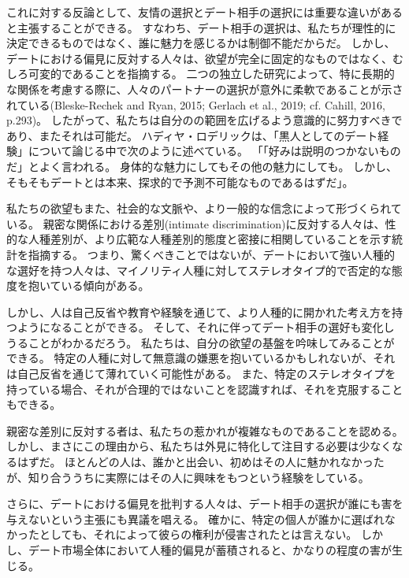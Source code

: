 \documentclass[paper=a4,book,openany]{jlreq}
\begin{document}
これに対する反論として、友情の選択とデート相手の選択には重要な違いがあると主張することができる。
すなわち、デート相手の選択は、私たちが理性的に決定できるものではなく、誰に魅力を感じるかは制御不能だからだ。
しかし、デートにおける偏見に反対する人々は、欲望が完全に固定的なものではなく、むしろ可変的であることを指摘する。
二つの独立した研究によって、特に長期的な関係を考慮する際に、人々のパートナーの選択が意外に柔軟であることが示されている(Bleske-Rechek and Ryan, 2015; Gerlach et al., 2019; cf. Cahill, 2016, p.293)。
\nocite{bleske-rechek15:_contin_chang_emerg,gerlach19:_predic_valid_adjus}
\nocite{cahill16:_sexual_desir_inequal_possib_trans}
したがって、私たちは自分のの範囲を広げるよう意識的に努力すべきであり、またそれは可能だ。
ハディヤ・ロデリックは、「黒人としてのデート経験」について論じる中で次のように述べている。
「「好みは説明のつかないものだ」とよく言われる。
身体的な魅力にしてもその他の魅力にしても。
しかし、そもそもデートとは本来、探求的で予測不可能なものであるはずだ」\citep{roderique17:_datin_black}。

私たちの欲望もまた、社会的な文脈や、より一般的な信念によって形づくられている。
親密な関係における差別(intimate discrimination)に反対する人々は、性的な人種差別が、より広範な人種差別的態度と密接に相関していることを示す統計を指摘する。
つまり、驚くべきことではないが、デートにおいて強い人種的な選好を持つ人々は、マイノリティ人種に対してステレオタイプ的で否定的な態度を抱いている傾向がある\citep{callander15:_is_sexual_racis_reall_racis}。

しかし、人は自己反省や教育や経験を通じて、より人種的に開かれた考え方を持つようになることができる。
そして、それに伴ってデート相手の選好も変化しうることがわかるだろう。
私たちは、自分の欲望の基盤を吟味してみることができる。
特定の人種に対して無意識の嫌悪を抱いているかもしれないが、それは自己反省を通じて薄れていく可能性がある。
また、特定のステレオタイプを持っている場合、それが合理的ではないことを認識すれば、それを克服することもできる。

親密な差別に反対する者は、私たちの惹かれが複雑なものであることを認める。
しかし、まさにこの理由から、私たちは外見に特化して注目する必要は少なくなるはずだ。
ほとんどの人は、誰かと出会い、初めはその人に魅かれなかったが、知り合ううちに実際にはその人に興味をもつという経験をしている。

さらに、デートにおける偏見を批判する人々は、デート相手の選択が誰にも害を与えないという主張にも異議を唱える。
確かに、特定の個人が誰かに選ばれなかったとしても、それによって彼らの権利が侵害されたとは言えない。
しかし、デート市場全体において人種的偏見が蓄積されると、かなりの程度の害が生じる\citep{lopez19:_sexual_racis_is}。
\end{document}
